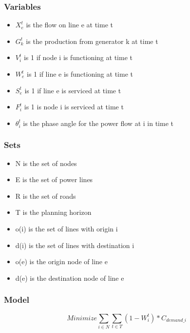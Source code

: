 \documentclass{article}
\begin{document}
	\subsubsection{Variables}
	\begin{itemize}
		
		\item $X_{e}^{t}$ is the flow on line e at time t
		\item $G_{k}^t$ is the production from generator k at time t
		\item $V_i^t$ is 1 if node i is functioning at time t
		\item $W_{e}^t$ is 1 if line e is functioning at time t
		\item $S_{e}^t$ is 1 if line e is serviced at time t
		\item $F_i^t$ is 1 is node i is serviced at time t 
		\item $\theta_i^t$ is the phase angle for the power flow at i in time t
	
	\end{itemize}
	\subsubsection{Sets}
	\begin{itemize}
		\item N is the set of nodes
		\item E is the set of power lines
		\item R is the set of roads
		\item T is the planning horizon
		\item o(i) is the set of lines with origin i
		\item d(i) is the set of lines with destination i
		\item o(e) is the origin node of line e
		\item d(e) is the destination node of line e
	\end{itemize}
	\subsubsection{Model}
	$$	Minimize \sum_{i \in N} \sum_{t \in T} (1-W_i^t)*C_{demand\_i} $$
	
\end{document}
